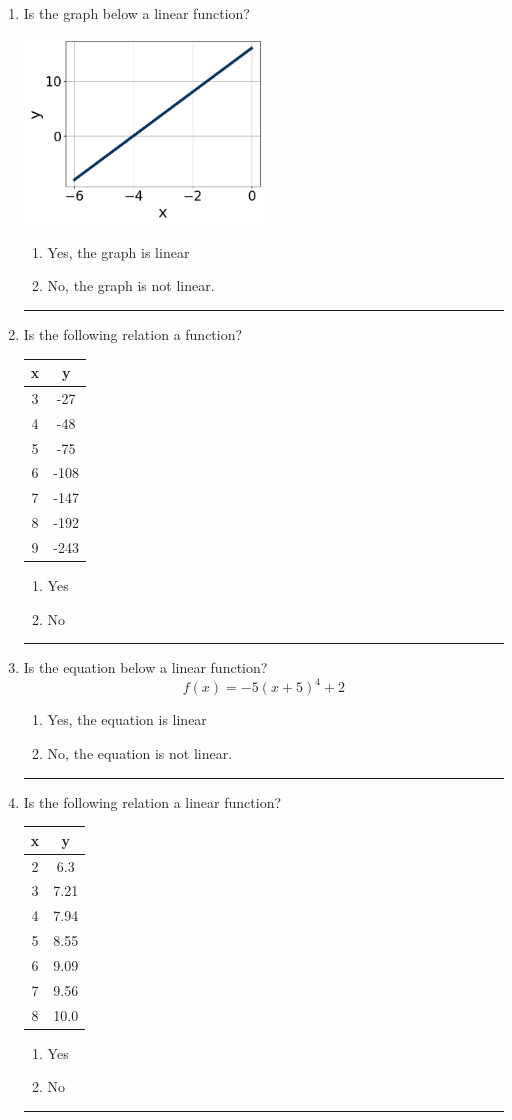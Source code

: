 \documentclass[14pt]{extbook}
\newcommand{\litem}[1]{\item#1\hspace*{-1cm}\rule{\textwidth}{0.4pt}}
\begin{document}
\begin{enumerate}
{\begin{enumerate}[label=\Alph*.]
\end{enumerate} }
\litem{
Is the graph below a linear function?
\begin{center}
    \includegraphics[width=0.5\textwidth]{../Figures/MA_8_F_1_2_graphW.png}
\end{center}
\begin{enumerate}[label=\Alph*.]
\item Yes, the graph is linear
\item No, the graph is not linear.

\end{enumerate} }
\litem{
Is the following relation a function?

\begin{tabular}{c|c}
x &y\tabularnewline \hline
3 &-27\tabularnewline \hline
4 &-48\tabularnewline \hline
5 &-75\tabularnewline \hline
6 &-108\tabularnewline \hline
7 &-147\tabularnewline \hline
8 &-192\tabularnewline \hline
9 &-243\end{tabular}\begin{enumerate}[label=\Alph*.]
\item Yes
\item No

\end{enumerate} }
\litem{
Is the equation below a linear function?\[ f(x) = -5(x + 5)^4+2 \]\begin{enumerate}[label=\Alph*.]
\item Yes, the equation is linear
\item No, the equation is not linear.

\end{enumerate} }
\litem{
Is the following relation a linear function?

\begin{tabular}{c|c}
x &y\tabularnewline \hline
2 &6.3\tabularnewline \hline
3 &7.21\tabularnewline \hline
4 &7.94\tabularnewline \hline
5 &8.55\tabularnewline \hline
6 &9.09\tabularnewline \hline
7 &9.56\tabularnewline \hline
8 &10.0\end{tabular}\begin{enumerate}[label=\Alph*.]
\item Yes
\item No


\end{enumerate}}
\end{enumerate}
\end{document}
